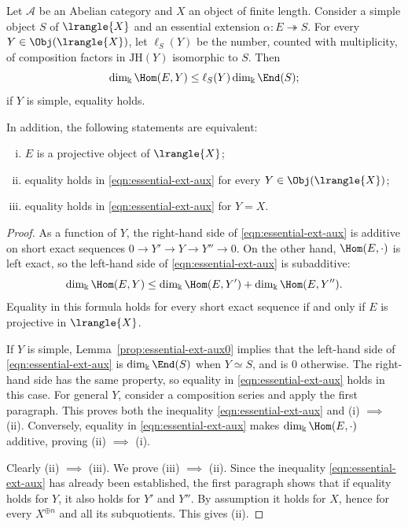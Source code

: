 \begin{lemma}\label{prop:essential-ext}
	Let $\mathcal{A}$ be an Abelian category and $X$ an object of finite length. Consider a simple object $S$ of $\lrangle{X}$ and an essential extension $\alpha:E\twoheadrightarrow S$. For every $Y\in\Obj(\lrangle{X})$, let $\ell_S(Y)$ be the number, counted with multiplicity, of composition factors in $\mathrm{JH}(Y)$ isomorphic to $S$. Then
	\begin{equation}\label{eqn:essential-ext-aux}
		\dim_{\Bbbk} \Hom(E, Y) \leq \ell_S(Y) \dim_{\Bbbk} \End(S);
	\end{equation}
	if $Y$ is simple, equality holds.

	In addition, the following statements are equivalent:
	\begin{enumerate}[(i)]
		\item $E$ is a projective object of $\lrangle{X}$;
		\item equality holds in \eqref{eqn:essential-ext-aux} for every $Y\in\Obj(\lrangle{X})$;
		\item equality holds in \eqref{eqn:essential-ext-aux} for $Y=X$.
	\end{enumerate}
\end{lemma}
\begin{proof}
	As a function of $Y$, the right-hand side of \eqref{eqn:essential-ext-aux} is additive on short exact sequences $0\to Y'\to Y\to Y''\to0$. On the other hand, $\Hom(E,\cdot)$ is left exact, so the left-hand side of \eqref{eqn:essential-ext-aux} is subadditive:
	\[ \dim_{\Bbbk} \Hom(E, Y) \leq \dim_{\Bbbk} \Hom(E, Y') + \dim_{\Bbbk} \Hom(E, Y''). \]
	Equality in this formula holds for every short exact sequence if and only if $E$ is projective in $\lrangle{X}$.

	If $Y$ is simple, Lemma~\ref{prop:essential-ext-aux0} implies that the left-hand side of \eqref{eqn:essential-ext-aux} is $\dim_{\Bbbk}\End(S)$ when $Y\simeq S$, and is $0$ otherwise. The right-hand side has the same property, so equality in \eqref{eqn:essential-ext-aux} holds in this case. For general $Y$, consider a composition series and apply the first paragraph. This proves both the inequality \eqref{eqn:essential-ext-aux} and (i) $\implies$ (ii). Conversely, equality in \eqref{eqn:essential-ext-aux} makes $\dim_{\Bbbk}\Hom(E,\cdot)$ additive, proving (ii) $\implies$ (i).

	Clearly (ii) $\implies$ (iii). We prove (iii) $\implies$ (ii). Since the inequality \eqref{eqn:essential-ext-aux} has already been established, the first paragraph shows that if equality holds for $Y$, it also holds for $Y'$ and $Y''$. By assumption it holds for $X$, hence for every $X^{\oplus n}$ and all its subquotients. This gives (ii).
\end{proof}

